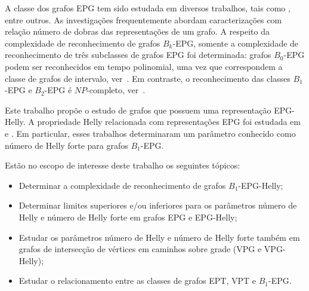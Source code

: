 A classe dos grafos EPG tem sido estudada em diversos trabalhos, tais como  \cite{alcon2016, Asinowski2009, cohen2014, golumbic2009, heldt2014,  martin2017}, entre outros. As investigações frequentemente abordam caracterizações com relação número de dobras das representações de um grafo. A respeito da complexidade de reconhecimento de grafos $B_k$-EPG, somente a complexidade de reconhecimento de três subclasses de grafos EPG foi determinada:
 grafos $B_0$-EPG podem ser reconhecidos em tempo polinomial, uma vez que correspondem a classe de grafos de intervalo, ver~\cite{booth1976, golumbic2009}. Em contraste, o reconhecimento das classes $B_1$-EPG e $B_2$-EPG é $NP$-completo, ver~\cite{heldt2014, martin2017}.







Este trabalho propõe o estudo de grafos que possuem uma representação EPG-Helly. 
A propriedade Helly relacionada com representações EPG foi  estudada em~\cite{golumbic2009} e \cite{golumbic2013}. Em particular, esses trabalhos determinaram um parâmetro conhecido como número de Helly forte  para grafos $B_1$-EPG. 

Estão no escopo de interesse deste trabalho os seguintes tópicos:

\begin{itemize}
    
    \item Determinar a complexidade de reconhecimento de grafos $B_1$-EPG-Helly;
    \item Determinar limites superiores e/ou inferiores para os parâmetros número de Helly e número de Helly forte em grafos EPG e EPG-Helly;
    
    \item Estudar os parâmetros número de Helly e número de Helly forte também em grafos de intersecção de vértices em caminhos sobre grade (VPG e VPG-Helly);
    
    \item Estudar o relacionamento entre as classes de grafos EPT, VPT e $B_1$-EPG.
    
\end{itemize}



